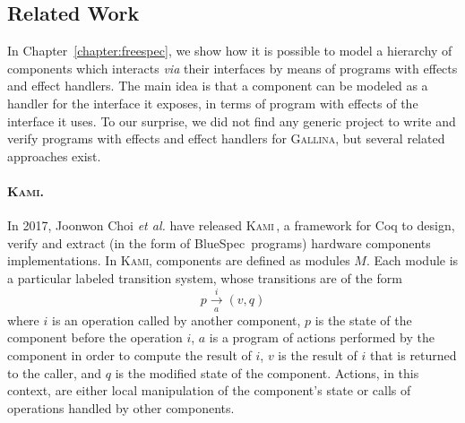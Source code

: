 
\subsection{Related Work}
\label{subsec:sota:comprelated}


In Chapter~\ref{chapter:freespec}, we show how it is possible to model a
hierarchy of components which interacts \emph{via} their interfaces by means of
programs with effects and effect handlers. 
%
The main idea is that a component can be modeled as a handler for the interface
it exposes, in terms of program with effects of the interface it uses.
%
To our surprise, we did not find any generic project to write and verify
programs with effects and effect handlers for {\scshape Gallina}, but
several related approaches exist.

\paragraph{{\scshape Kami}.}
%
In 2017, Joonwon Choi \emph{et al.} have released {\scshape
  Kami}\,\cite{choi2017kami}, a framework for Coq to design, verify and extract
(in the form of BlueSpec\,\cite{nikhil2004bluespec} programs) hardware
components implementations.
%
In {\scshape Kami}, components are defined as modules \( M \). Each module is a
particular labeled transition system, whose transitions are of the form
%
\[
  p \xrightarrow[a]{i} (v, q)
\]
%
where  \( i \)  is an operation called by another component, \( p \) is the state of the component before the operation \( i \), \( a \) is a program of actions performed by the
component in order to compute the result of \( i \), \( v \) is the result of
\( i \) that is returned to the caller, and \( q \) is the modified state of the
component.
%
Actions, in this context, are either local manipulation of the component's state
or calls of operations handled by other components.

